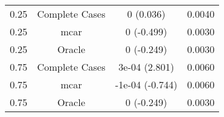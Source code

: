\begin{table}[ht]
\centering
\begin{tabular}{cccc}
  \hline
  \hline
0.25 & Complete Cases & 0 (0.036) & 0.0040 \\ 
  0.25 & mcar & 0 (-0.499) & 0.0030 \\ 
  0.25 & Oracle & 0 (-0.249) & 0.0030 \\ 
  0.75 & Complete Cases & 3e-04 (2.801) & 0.0060 \\ 
  0.75 & mcar & -1e-04 (-0.744) & 0.0060 \\ 
  0.75 & Oracle & 0 (-0.249) & 0.0030 \\ 
   \hline
\end{tabular}
\end{table}
